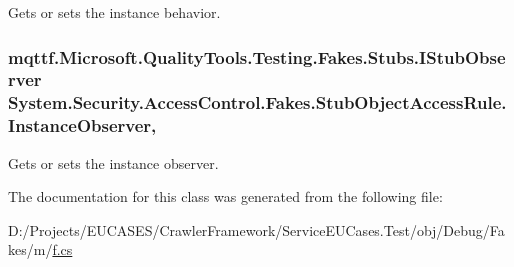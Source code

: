 Gets or sets the instance behavior.

\hypertarget{class_system_1_1_security_1_1_access_control_1_1_fakes_1_1_stub_object_access_rule_a4d179259819678977a2f7c3e0db381b4}{
\subsubsection[{Instance\-Observer}]{\setlength{\rightskip}{0pt plus 5cm}mqttf.\-Microsoft.\-Quality\-Tools.\-Testing.\-Fakes.\-Stubs.\-I\-Stub\-Observer System.\-Security.\-Access\-Control.\-Fakes.\-Stub\-Object\-Access\-Rule.\-Instance\-Observer\hspace{0.3cm}{\ttfamily [get]}, {\ttfamily [set]}}}\label{class_system_1_1_security_1_1_access_control_1_1_fakes_1_1_stub_object_access_rule_a4d179259819678977a2f7c3e0db381b4}


Gets or sets the instance observer.



The documentation for this class was generated from the following file\-:\begin{DoxyCompactItemize}
\item 
D\-:/\-Projects/\-E\-U\-C\-A\-S\-E\-S/\-Crawler\-Framework/\-Service\-E\-U\-Cases.\-Test/obj/\-Debug/\-Fakes/m/\hyperlink{m_2f_8cs}{f.\-cs}\end{DoxyCompactItemize}
